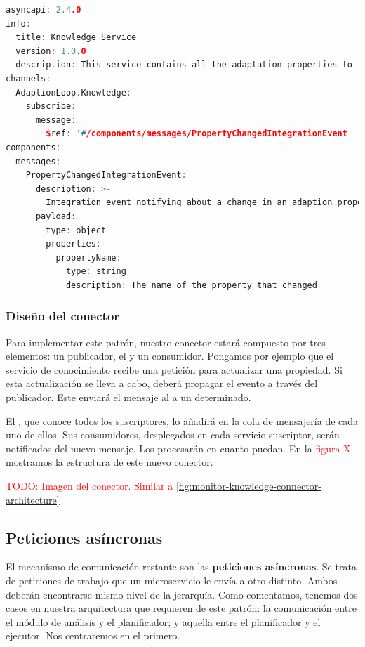 \begin{lstlisting}[language={C++},caption={Ejemplo del evento de integración \emph{builder}.},captionpos=b, label=ls:asyncapi-propertychanged-integrationevent]
asyncapi: 2.4.0
info:
  title: Knowledge Service
  version: 1.0.0
  description: This service contains all the adaptation properties to inform the different stages of the loop.
channels:
  AdaptionLoop.Knowledge:
    subscribe:
      message:
        $ref: '#/components/messages/PropertyChangedIntegrationEvent'
components:
  messages:
    PropertyChangedIntegrationEvent:
      description: >-
        Integration event notifying about a change in an adaption property.
      payload:
        type: object
        properties:
          propertyName:
            type: string
            description: The name of the property that changed
\end{lstlisting}

\subsubsection{Diseño del conector}

Para implementar este patrón, nuestro conector estará compuesto por tres elementos: un publicador, el  y un consumidor. Pongamos por ejemplo que el servicio de conocimiento recibe una petición para actualizar una propiedad. Si esta actualización se lleva a cabo, deberá propagar el evento a través del publicador. Este enviará el mensaje al  a un  determinado.

El , que conoce todos los suscriptores, lo añadirá en la cola de mensajería de cada uno de ellos. Sus consumidores, desplegados en cada servicio suscriptor, serán notificados del nuevo mensaje. Los procesarán en cuanto puedan. En la \textcolor{red}{figura X} mostramos la estructura de este nuevo conector.

\textcolor{red}{TODO: Imagen del conector. Similar a \ref{fig:monitor-knowledge-connector-architecture}}

\subsection{Peticiones asíncronas}

El mecanismo de comunicación restante son las \textbf{peticiones asíncronas}. Se trata de peticiones de trabajo que un microservicio le envía a otro distinto. Ambos deberán encontrarse mismo nivel de la jerarquía. Como comentamos, tenemos dos casos en nuestra arquitectura que requieren de este patrón: la comunicación entre el módulo de análisis y el planificador; y aquella entre el planificador y el ejecutor. Nos centraremos en el primero.

